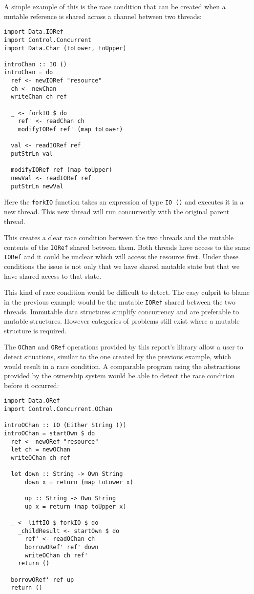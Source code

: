 \documentclass[onehalf,11pt]{beavtex}
\begin{document}
\newpage

A simple example of this is the race condition that can be created when a
mutable reference is shared across a channel between two threads:

\begin{lstlisting}
import Data.IORef
import Control.Concurrent
import Data.Char (toLower, toUpper)

introChan :: IO ()
introChan = do
  ref <- newIORef "resource"
  ch <- newChan
  writeChan ch ref

  _ <- forkIO $ do
    ref' <- readChan ch
    modifyIORef ref' (map toLower)

  val <- readIORef ref
  putStrLn val

  modifyIORef ref (map toUpper)
  newVal <- readIORef ref
  putStrLn newVal
\end{lstlisting}

Here the \texttt{forkIO} function takes an expression of type \texttt{IO ()}
and executes it in a new thread.
This new thread will run concurrently with the original parent thread.

This creates a clear race condition between the two threads and the mutable
contents of the \texttt{IORef} shared between them.
Both threads have access to the same \texttt{IORef} and it could be unclear
which will access the resource first.  Under these conditions the issue is not
only that we have shared mutable state but that we have shared access to that
state.

This kind of race condition would be difficult to detect. 
The easy culprit to blame in the previous example would be the
mutable \texttt{IORef} shared between the two threads.
Immutable data structures simplify concurrency and are preferable to
mutable structures. However categories of problems still exist where a
mutable structure is required.

The \texttt{OChan} and \texttt{ORef} operations provided by this report's library
allow a user to detect situations, similar to the one created by the previous
example, which would result in a race condition.
A comparable program using the abstractions provided by the ownership system
would be able to detect the race condition before it occurred:

\begin{lstlisting}
import Data.ORef
import Control.Concurrent.OChan

introOChan :: IO (Either String ())
introOChan = startOwn $ do
  ref <- newORef "resource"
  let ch = newOChan
  writeOChan ch ref

  let down :: String -> Own String
      down x = return (map toLower x)

      up :: String -> Own String
      up x = return (map toUpper x)

  _ <- liftIO $ forkIO $ do
    _childResult <- startOwn $ do
      ref' <- readOChan ch
      borrowORef' ref' down
      writeOChan ch ref'
    return ()

  borrowORef' ref up
  return ()
\end{lstlisting}
\end{document}
